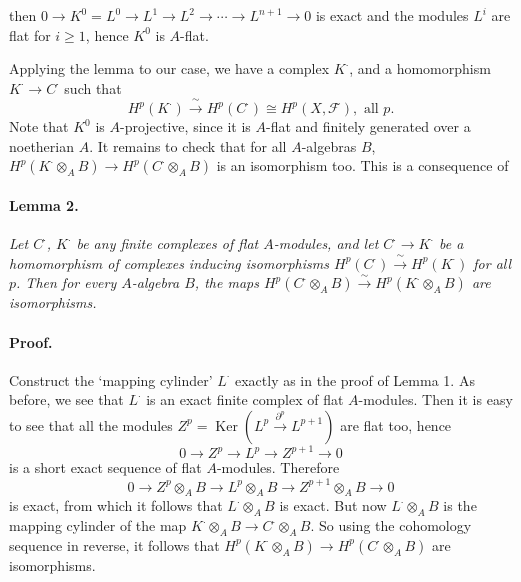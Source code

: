
\DeclareMathOperator{\Spec}{Spec}
\DeclareMathOperator{\Ker}{Ker}


then $0 \to K^0 = L^0 \to L^1 \to L^2 \to \cdots \to L^{n+1} \to 0$ is exact
and the modules $L^i$ are flat for $i \geq 1$, hence $K^0$ is $A$-flat.

Applying the lemma to our case, we have a complex $K^{\cdot}$, and a
homomorphism $K^{\cdot} \to C^{\cdot}$ such that
\[
  H^p(K^{\cdot}) \xrightarrow{\ \sim\ } H^p(C^{\cdot})
    \cong H^p(X, \mathcal{F}), \text{ all } p.
\]
Note that $K^0$ is $A$-projective, since it is $A$-flat and finitely
generated over a noetherian $A$. It remains to check that for all
$A$-algebras $B$,
$H^p(K^{\cdot} \otimes_A B) \to H^p(C^{\cdot} \otimes_A B)$ is an
isomorphism too. This is a consequence of

\paragraph{Lemma 2.}
\textit{Let $C^{\cdot}$, $K^{\cdot}$ be any finite complexes of flat
$A$-modules, and let $C^{\cdot} \to K^{\cdot}$ be a homomorphism of
complexes inducing isomorphisms
$H^p(C^{\cdot}) \xrightarrow{\ \sim\ } H^p(K^{\cdot})$ for all $p$. Then for
every $A$-algebra $B$, the maps
$H^p(C^{\cdot} \otimes_A B) \xrightarrow{\ \sim\ }
 H^p(K^{\cdot} \otimes_A B)$ are isomorphisms.}

\paragraph{Proof.}
Construct the `mapping cylinder' $L^{\cdot}$ exactly as in the proof of
Lemma 1. As before, we see that $L^{\cdot}$ is an exact finite complex of
flat $A$-modules. Then it is easy to see that all the modules
$Z^p = \Ker(L^p \xrightarrow{\ \partial^p\ } L^{p+1})$ are flat too, hence
\[
  0 \longrightarrow Z^p \longrightarrow L^p \longrightarrow Z^{p+1}
    \longrightarrow 0
\]
is a short exact sequence of flat $A$-modules. Therefore
\[
  0 \longrightarrow Z^p \otimes_A B \longrightarrow L^p \otimes_A B
    \longrightarrow Z^{p+1} \otimes_A B \longrightarrow 0
\]
is exact, from which it follows that $L^{\cdot} \otimes_A B$ is exact. But
now $L^{\cdot} \otimes_A B$ is the mapping cylinder of the map
$K^{\cdot} \otimes_A B \to C^{\cdot} \otimes_A B$. So using the cohomology
sequence in reverse, it follows that
$H^p(K^{\cdot} \otimes_A B) \to H^p(C^{\cdot} \otimes_A B)$ are
isomorphisms.

